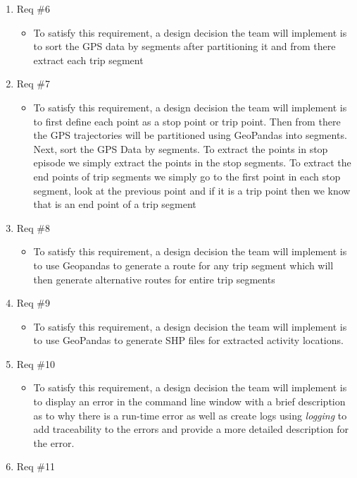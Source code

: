 \documentclass[12pt, titlepage]{article}
\begin{document}
\begin{enumerate}
    \item Req \#6
    \begin{itemize}
        \item To satisfy this requirement, a design decision the team will implement is to sort the GPS data by segments after partitioning it and from there extract each trip segment
    \end{itemize}
    \item Req \#7
    \begin{itemize}
        \item To satisfy this requirement, a design decision the team will implement is to first define each point as a stop point or trip point. Then from there the GPS trajectories will be partitioned using GeoPandas into segments. Next, sort the GPS Data by segments. To extract the points in stop episode we simply extract the points in the stop segments. To extract the end points of trip segments we simply go to the first point in each stop segment, look at the previous point and if it is a trip point then we know that is an end point of a trip segment
    \end{itemize}
    \item Req \#8
    \begin{itemize}
        \item To satisfy this requirement, a design decision the team will implement is to use Geopandas to generate a route for any trip segment which will then generate alternative routes for entire trip segments
    \end{itemize}
    \item Req \#9
    \begin{itemize}
        \item To satisfy this requirement, a design decision the team will implement is to use GeoPandas to generate SHP files for extracted activity locations.
    \end{itemize}
    \item Req \#10
    \begin{itemize}
        \item To satisfy this requirement, a design decision the team will implement is to display an error in the command line window with a brief description as to why there is a run-time error as well as create logs using \emph{logging} to add traceability to the errors and provide a more detailed description for the error.
    \end{itemize}
    \item Req \#11
    \begin{itemize}

\end{itemize}
\end{enumerate}
\end{document}
